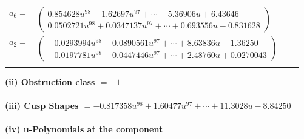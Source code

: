 \documentclass[1p]{elsarticle_modified}
\theoremstyle{definition}
\begin{document}
\begin{tabular}{m{7pt} m{180pt} m{7pt} m{180pt} }
\flushright $a_{6}=$&$\begin{pmatrix}0.854628 u^{98}-1.62697 u^{97}+\cdots-5.36906 u+6.43646\\0.0502721 u^{98}+0.0347137 u^{97}+\cdots+0.693556 u-0.831628\end{pmatrix}$ \\
\flushright $a_{2}=$&$\begin{pmatrix}-0.0293994 u^{98}+0.0890561 u^{97}+\cdots+8.63836 u-1.36250\\-0.0197781 u^{98}+0.0447446 u^{97}+\cdots+2.48760 u+0.0270043\end{pmatrix}$\\&\end{tabular}
\flushleft \textbf{(ii) Obstruction class $= -1$}\\~\\
\flushleft \textbf{(iii) Cusp Shapes $= -0.817358 u^{98}+1.60477 u^{97}+\cdots+11.3028 u-8.84250$}\\~\\
\newpage\renewcommand{\arraystretch}{1}
\flushleft \textbf{(iv) u-Polynomials at the component}\newline \\
\end{document}
